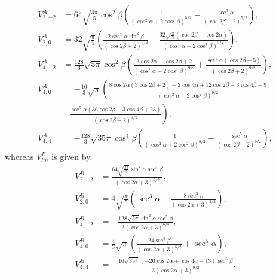 \documentclass[a4paper,prb]{revtex4-1}  %
\newcommand{\az}[1]{{\color{magenta}{#1}}} %
\begin{document}
\begin{align}
V^A_{2,-2}&= 64 \sqrt{\frac{3 \pi }{5}} \cos ^2\beta  \left(\frac{1}{\left(\cos ^2\alpha +2 \cos ^2\beta \right)^{5/2}}-\frac{\sec ^3\alpha }{(\cos 2 \beta +2)^{5/2}}\right),\\
V^A_{2,0}&= 32 \sqrt{\frac{\pi }{5}} \left(\frac{2 \sec ^3\alpha  \sin ^2\beta }{(\cos 2 \beta +2)^{5/2}}-\frac{32 \sqrt{\frac{\pi }{5}} (\cos 2 \beta -\cos 2 \alpha )}{\left(\cos ^2\alpha +2 \cos ^2\beta \right)^{5/2}}\right),\\
V^A_{4,-2}&= \frac{128}{3} \sqrt{5 \pi } \cos ^2\beta  \left(\frac{3 \cos 2 \alpha -\cos 2 \beta +2}{\left(\cos ^2\alpha +2 \cos ^2\beta \right)^{9/2}}+\frac{\sec ^5\alpha  (\cos 2 \beta -5)}{(\cos 2 \beta +2)^{9/2}}\right),\\ \nonumber
V^A_{4,0}&= -\frac{16}{3} \sqrt{\pi } \left(\frac{8 \cos 2 \alpha  (3 \cos 2 \beta +2)-2 \cos 4 \alpha+12 \cos 2 \beta -3 \cos 4 \beta +9}{\left(\cos ^2\alpha +2 \cos ^2\beta \right)^{9/2}}\right. \\
&+\left. \frac{\sec ^5\alpha  (36 \cos 2 \beta -3 \cos 4 \beta +23)}{(\cos 2 \beta +2)^{9/2}}\right),\\
V^A_{4,4}&=-\frac{128}{3} \sqrt{35 \pi } \cos ^4\beta  \left(\frac{1}{\left(\cos ^2\alpha +2 \cos ^2\beta \right)^{9/2}}+\frac{\sec ^5\alpha }{(\cos 2 \beta +2)^{9/2}}\right),
\end{align}
whereas $V_{lm}^{B}$ is given by,
\begin{align}
V^{B}_{2,-2}&=  \frac{64 \sqrt{\frac{3 \pi }{5}} \sin ^2\alpha  \sec ^3\beta }{(\cos 2 \alpha +3)^{5/2}},
 \\ V^{B}_{2,0}&=  4 \sqrt{\frac{\pi }{5}} \left(\sec ^3\alpha -\frac{8 \sec ^3\beta }{(\cos 2 \alpha +3)^{3/2}}\right),\\
 V^{B}_{4,-2}&=  -\frac{128 \sqrt{5 \pi } \sin ^2\alpha  \sec ^5\beta }{3 (\cos 2 \alpha +3)^{7/2}},\\ 
V^{B}_{4,0}&= \frac{4}{3} \sqrt{\pi } \left(\frac{24 \sec ^5\beta }{(\cos 2 \alpha +3)^{5/2}}+\sec ^5\alpha \right),\\
 V^{B}_{4,4}&=  -\frac{16 \sqrt{35 \pi } (-20 \cos 2 \alpha +\cos 4 \alpha -13) \sec ^5\beta }{3 (\cos 2 \alpha +3)^{9/2}}.
 \end{align}
\end{document}
